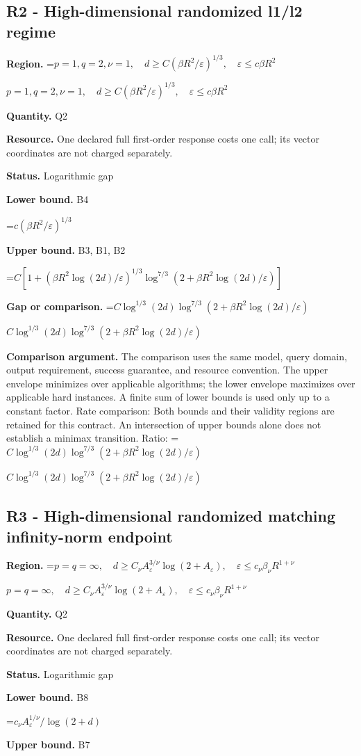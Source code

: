 \documentclass[10pt,a4paper]{article}
\newcommand{\AtlasMath}[1]{\par\begingroup\centering\setbox0=\hbox{$\displaystyle #1$}\ifdim\wd0>1.4\linewidth\typeout{ATLAS WIDE FORMULA: \the\wd0}\fi\ifdim\wd0>\linewidth\resizebox{\linewidth}{!}{\box0}\else\box0\fi\par\endgroup}
\newcommand{\AtlasInlineMath}[1]{\begingroup\setbox0=\hbox{$#1$}\ifdim\wd0>.4\linewidth\endgroup\AtlasMath{#1}\else\endgroup$#1$\fi}
\begin{document}
\subsection{R2 - High-dimensional randomized l1/l2 regime}
\textbf{Region.} \AtlasInlineMath{p=1,q=2,\nu=1,\quad d\ge C(\beta R^2/\varepsilon)^{1/3},\quad\varepsilon\le c\beta R^2}

\textbf{Quantity.} Q2

\textbf{Resource.} One declared full first-order response costs one call; its vector coordinates are not charged separately.

\textbf{Status.} Logarithmic gap

\textbf{Lower bound.} B4

\AtlasMath{c(\beta R^2/\varepsilon)^{1/3}}
\textbf{Upper bound.} B3, B1, B2

\AtlasMath{C[1+(\beta R^2\log(2d)/\varepsilon)^{1/3}\log^{7/3}(2+\beta R^2\log(2d)/\varepsilon)]}
\textbf{Gap or comparison.} \AtlasInlineMath{C\log^{1/3}(2d)\log^{7/3}(2+\beta R^2\log(2d)/\varepsilon)}

\textbf{Comparison argument.} The comparison uses the same model, query domain, output requirement, success guarantee, and resource convention. The upper envelope minimizes over applicable algorithms; the lower envelope maximizes over applicable hard instances. A finite sum of lower bounds is used only up to a constant factor. Rate comparison: Both bounds and their validity regions are retained for this contract. An intersection of upper bounds alone does not establish a minimax transition. Ratio: \AtlasInlineMath{C\log^{1/3}(2d)\log^{7/3}(2+\beta R^2\log(2d)/\varepsilon)}

\subsection{R3 - High-dimensional randomized matching infinity-norm endpoint}
\textbf{Region.} \AtlasInlineMath{p=q=\infty,\quad d\ge C_\nu A_\varepsilon^{3/\nu}\log(2+A_\varepsilon),\quad\varepsilon\le c_\nu\beta_\nu R^{1+\nu}}

\textbf{Quantity.} Q2

\textbf{Resource.} One declared full first-order response costs one call; its vector coordinates are not charged separately.

\textbf{Status.} Logarithmic gap

\textbf{Lower bound.} B8

\AtlasMath{c_\nu A_\varepsilon^{1/\nu}/\log(2+d)}
\textbf{Upper bound.} B7
\end{document}
